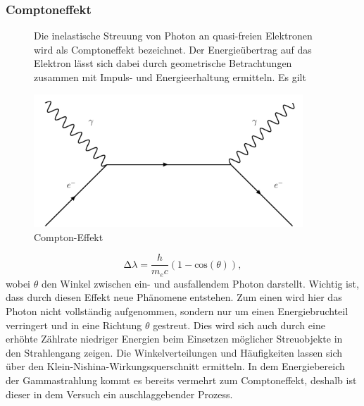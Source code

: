 \subsubsection{Comptoneffekt}
\begin{figure}
\begin{minipage}{0.5\textwidth}
Die inelastische Streuung von Photon an quasi-freien Elektronen wird als Comptoneffekt bezeichnet. 
Der Energieübertrag auf das Elektron lässt sich dabei durch geometrische Betrachtungen zusammen mit Impuls- und Energieerhaltung ermitteln. Es gilt
\end{minipage}
\begin{minipage}{0.5\textwidth}
    \centering
    \includegraphics[width=0.9\textwidth]{bilder/compton.pdf}
    \caption{Compton-Effekt}
\end{minipage}
\end{figure}


\begin{equation}
    \increment \lambda = \frac{h}{m_e c} (1 - \text{cos}(\theta)),
\end{equation}
wobei $\theta$ den Winkel zwischen ein- und ausfallendem Photon darstellt. 
Wichtig ist, dass durch diesen Effekt neue Phänomene entstehen. Zum einen wird hier das Photon nicht vollständig aufgenommen, sondern nur um einen Energiebruchteil verringert und in eine Richtung $\theta$ gestreut. 
Dies wird sich auch durch eine erhöhte Zählrate niedriger Energien beim Einsetzen möglicher Streuobjekte in den Strahlengang zeigen. Die Winkelverteilungen und Häufigkeiten lassen sich über den Klein-Nishina-Wirkungsquerschnitt ermitteln. 
In dem Energiebereich der Gammastrahlung kommt es bereits vermehrt zum Comptoneffekt, deshalb ist dieser in dem Versuch ein auschlaggebender Prozess.
